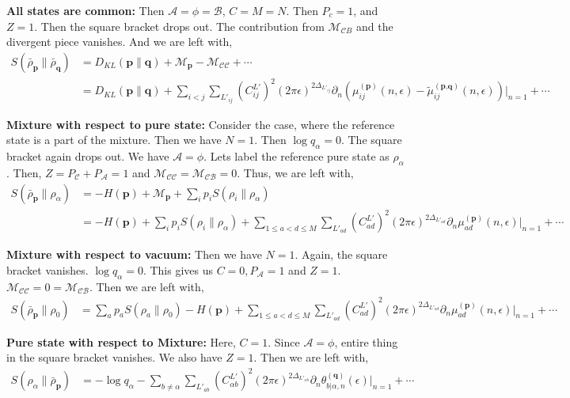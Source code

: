 \documentclass[11pt]{article}
\newcommand{\ep}{\epsilon}
\newcommand{\p}{\partial}
\newcommand{\lb}{\left(}
\newcommand{\rb}{\right)}
\begin{document}
\textbf{All states are common:} Then $\mathcal{A} = \phi = \mathcal{B}$, $C=M=N$. Then $P_c =1$, and $Z=1$. Then the square bracket drops out. The contribution from $\mathcal{M}_{\mathcal{C}B}$ and the divergent piece vanishes. And we are left with,
\begin{align}
    S(\bar \rho_{\textbf{p}} \| \bar \rho_{\textbf{q}})&= D_{KL}(\textbf{p}\| \textbf{q}) + \mathcal{M}_{\textbf{p}} - \mathcal{M}_{\mathcal{C}\mathcal{C}} + \cdots \\ 
    &= D_{KL}(\textbf{p}\|\textbf{q}) +  \sum_{i<j}\sum_{L'_{ij}}\lb C_{ij}^{L'}\rb^2 (2\pi\ep)^{2\Delta_{L'_{ij}}} \p_n \lb\mu_{ij}^{(\textbf{p})}(n,\ep)- \tilde{\mu}_{ij}^{(\textbf{p,q})}(n,\ep)\rb\Big|_{n=1}+\cdots
\end{align}

\textbf{Mixture with respect to pure state:} Consider the case, where the reference state is a part of the mixture. Then we have $N=1$. Then $\log q_\alpha = 0$. The square bracket again drops out. We have $\mathcal{A} = \phi$.   Lets label the reference pure state as $\rho_\alpha$. Then, $Z = P_\mathcal{C} + P_\mathcal{A} = 1$ and $\mathcal{M}_{\mathcal{C}\mathcal{C}} = \mathcal{M}_{\mathcal{C}\mathcal{B}} = 0$. Thus, we are left with,
\begin{align}
    S(\bar\rho_{\textbf{p}}\| \rho_\alpha) &= -H(\textbf{p}) + \mathcal{M}_{\textbf{p}}+\sum_i p_i S(\rho_i\|\rho_\alpha) \\
&=-H(\textbf{p}) + \sum_i p_i S(\rho_i\|\rho_\alpha) + \sum_{1\leq a<d\leq M}\sum_{L'_{ad}} \lb C_{ad}^{L'}\rb^2 (2\pi\ep)^{2\Delta_{L'_{ad}}}\p_n\mu_{ad}^{(\textbf{p})}(n,\ep)\Big|_{n=1} + \cdots 
\end{align}

\textbf{Mixture with respect to vacuum:} Then we have $N=1$. Again, the square bracket vanishes. $\log q_\alpha = 0$. This gives us $C=0, P_\mathcal{A} = 1$ and $Z =1$. $\mathcal{M}_{\mathcal{C}\mathcal{C}} = 0 = \mathcal{M}_{\mathcal{C}\mathcal{B}}$. Then we are left with,
\begin{align}
    S(\bar \rho_{\textbf{p}}\| \rho_0) &=  \sum_{a}p_a S(\rho_a\| \rho_0) - H(\textbf{p}) + \sum_{1\leq a<d\leq M}\sum_{L'_{ad}} \lb C_{ad}^{L'}\rb^2 (2\pi\ep)^{2\Delta_{L'_{ad}}}\p_n\mu_{ad}^{(\textbf{p})}(n,\ep)\Big|_{n=1} + \cdots 
\end{align}


\textbf{Pure state with respect to Mixture:} Here, $C =1$. Since $\mathcal{A} = \phi$, entire thing in the square bracket vanishes. We also have $Z=1$. Then we are left with,
\begin{align}
    S(\rho_\alpha \| \bar\rho_{\textbf{p}}) &= -\log q_\alpha - \sum_{b\neq \alpha} \sum_{L'_{ab}} \lb C^{L'}_{\alpha b}\rb^2 (2\pi\ep)^{2\Delta_{L'_{\alpha b}}}\p_n  \theta_{b|\alpha,n}^{(\textbf{q})}(\ep) \Big|_{n=1} + \cdots
\end{align}
\end{document}
